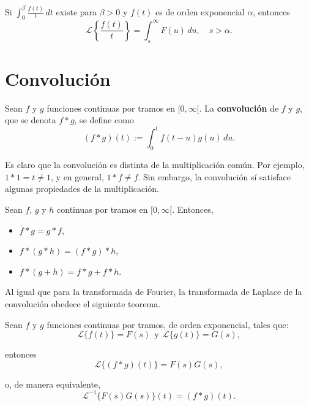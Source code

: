\begin{teorema}
   Si $\int_0^{\beta} \frac{f(t)}{t} \,dt$ existe para $\beta > 0$ y $f(t)$ es de orden exponencial $\alpha$, entonces
   $$\mathcal{L}\left\{\frac{f(t)}{t}\right\} = \int_s^{\infty} F(u) \,du, \quad s > \alpha.$$
\end{teorema}

\section{Convolución}

\begin{defi}
   Sean $f$ y $g$ funciones continuas por tramos en $[0, \infty[$. La \textbf{convolución} de $f$ y $g$, que se denota $f*g$, se define como
\begin{equation*}
(f*g)(t) := \int_0^t f(t-u)g(u) \, du.
\end{equation*}  
\end{defi}

Es claro que la convolución es distinta de la multiplicación común. Por ejemplo, $1*1 = t \neq 1$, y en general, $1*f \neq f$. Sin embargo, la convolución sí satisface algunas propiedades de la multiplicación.

\begin{teorema}
Sean $f$, $g$ y $h$ continuas por tramos en $[0,  \infty[$. Entonces,

\begin{itemize}
\item[(i)] $f*g = g*f$,

\item[(ii)] $f*(g*h) = (f*g)*h$,  

\item[(iii)] $f*(g+h) = f*g + f*h$. 
\end{itemize} 
\end{teorema}

Al igual que para la transformada de Fourier, la transformada de Laplace de la convolución obedece el siguiente teorema.

\begin{teorema}[de Convolución] \label{Teo:Convolucion}
    Sean $f$ y $g$ funciones continuas por tramos, de orden exponencial, tales que:
    \begin{equation*}
    \mathcal{L}\{f(t)\} = F(s) ~~\mbox{y}~~ \mathcal{L}\{g(t)\} = G(s),
    \end{equation*}

    entonces
    \begin{equation*}
    \mathcal{L}\{(f*g)(t)\} = F(s)G(s),
    \end{equation*}

    o, de manera equivalente,
    \begin{equation*}
    \mathcal{L}^{-1}\{F(s)G(s)\}(t) = (f*g)(t).
    \end{equation*}    
\end{teorema}

